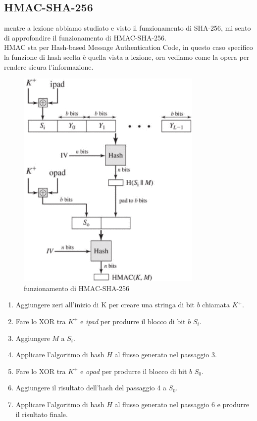\documentclass[a4paper,12pt]{report}
\begin{document}
		\subsection{HMAC-SHA-256}
		mentre a lezione abbiamo studiato e visto il funzionamento di SHA-256, mi sento 
		di approfondire il funzionamento di HMAC-SHA-256.\\
		HMAC sta per Hash-based Message Authentication Code, in questo caso specifico
		la funzione di hash scelta è quella vista a lezione, ora vediamo come la opera 
		per rendere sicura l'informazione.\cite{HMAC}
		\begin{figure}[H]
			\centering
			\includegraphics[width=0.8\textwidth]{HMAC-structure.png}
			\caption{funzionamento di HMAC-SHA-256}
			\label{fig:hmac-sha256}
		\end{figure}
		\begin{enumerate}
			\item Aggiungere zeri all'inizio di K per creare una stringa di bit $b$
			chiamata $K^+$.
			\item Fare lo XOR tra $K^+$ e \textit{ipad} per produrre il blocco di bit
			$b$ $S_i$.
			\item Aggiungere $M$ a $S_i$.
			\item Applicare l'algoritmo di hash $H$ al flusso generato nel passaggio 3.
			\item Fare lo XOR tra $K^+$ e \textit{opad} per produrre il blocco di bit
			$b$ $S_0$.
			\item Aggiungere il risultato dell'hash del passaggio 4 a $S_0$.
			\item Applicare l'algoritmo di hash $H$ al flusso generato nel passaggio 6 e
			produrre il risultato finale.
		\end{enumerate}
\end{document}
